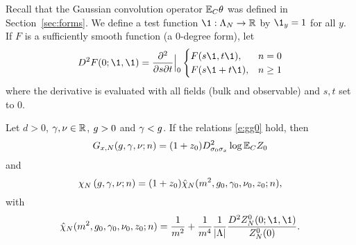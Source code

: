 Recall that the Gaussian convolution operator $\mathbb{E}_C\theta$ was defined in
Section~\ref{sec:forms}. We define a test function $\1: \Lambda_N \to \R$ by
$\1_y=1$ for all $y$. If $F$ is a sufficiently smooth function  (a $0$-degree form), let
\begin{equation}
D^2 F(0; \1, \1)
  =
\ddp{^2}{s\partial t}\Big|_0
\begin{cases}
F(s \1, t\1), & n = 0 \\
F(s \1 + t\1), & n \ge 1
\end{cases}
\end{equation}
where the derivative is evaluated with all fields (bulk and observable) and $s, t$ set to $0$.

\begin{prop}
\label{prop:intrep}
Let $d > 0$, $\gamma, \nu \in {\mathbb R}$, $g >0$ and $\gamma <g$.
If the relations \eqref{e:gg0} hold, then
\begin{equation}
\label{e:generating-fn}
G_{x,N}(g, \gamma, \nu; n)
	=
(1+z_0)
D^2_{\sigma_0\sigma_x}
\log \mathbb{E}_C Z_0
\end{equation}
and
\begin{equation}
\label{e:chichibar}
\chi_N\left(g,\gamma,\nu; n\right)
	=
(1+z_0)\hat\chi_N(m^2, g_0, \gamma_0, \nu_0, z_0; n),
\end{equation}
with
\begin{equation}
\label{e:chibarm}
\hat\chi_N(m^2, g_0, \gamma_0, \nu_0, z_0; n)
	=
\frac{1}{m^2}
	+
\frac{1}{m^4} \frac{1}{|\Lambda|} \frac{D^2 Z_N^\zero(0; \1, \1)}{Z^0_N(0)}.
\end{equation}
\end{prop}

